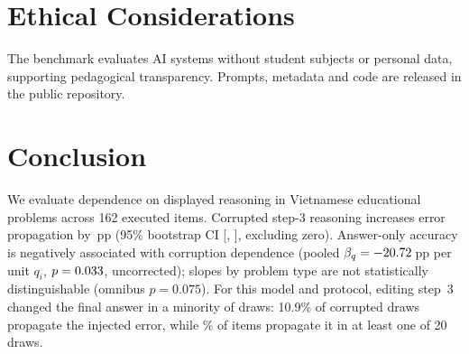 \section{Ethical Considerations}
\label{sec:ethics}

The benchmark evaluates AI systems without student subjects or personal data, supporting pedagogical transparency. Prompts, metadata and code are released in the public repository.

\section{Conclusion}

We evaluate dependence on displayed reasoning in Vietnamese educational problems across 162 executed items. Corrupted step-3 reasoning increases error propagation by \CDEpp\,pp (95\% bootstrap CI [\CDECILow, \CDECIHigh], excluding zero). Answer-only accuracy is negatively associated with corruption dependence (pooled $\beta_q = -20.72$\,pp per unit $q_i$, $p = 0.033$, uncorrected); slopes by problem type are not statistically distinguishable (omnibus $p = 0.075$). For this model and protocol, editing step~3 changed the final answer in a minority of draws: 10.9\% of corrupted draws propagate the injected error, while \ItemsAnyPropPct\% of items propagate it in at least one of 20 draws.
